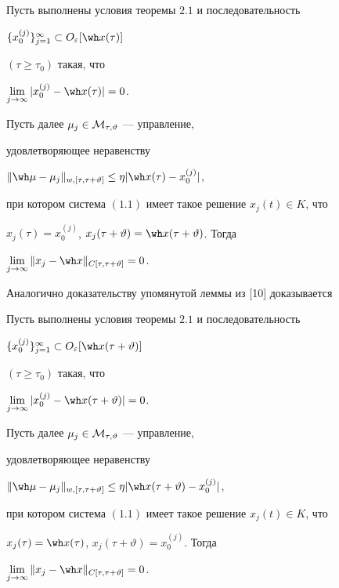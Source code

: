 \begin{lems}


Пусть выполнены условия теоремы $2.1$ и последовательность


$\{x_0^{(j)}\}_{j=1}^\infty\subset O_\varepsilon[\wh x(\tau)]$


$(\tau\ge\tau_0)$ такая, что


$\lim\limits_{j\to\infty}|x_0^{(j)}-\wh x(\tau)|=0$.


Пусть далее $\mu_j\in\cal M_{\tau,\vartheta}$ --- управление,


удовлетворяющее неравенству


$\|\wh\mu-\mu_j\|_{w,[\tau,\tau+\vartheta]}\le\eta|\wh


x(\tau)-x_0^{(j)}|$,


при котором система $(1.1)$ имеет такое решение $x_j(t)\in K$, что


$x_j(\tau)=x_0^{(j)}$, $x_{j}(\tau+\vartheta)=\wh


x(\tau+\vartheta)$. Тогда


$\lim\limits_{j\to\infty}\|x_j-\wh x\|_{C[\tau,\tau+\vartheta]}=0$.


\end{lems}





Аналогично доказательству упомянутой леммы из [10] доказывается








\begin{lems}


Пусть выполнены условия теоремы $2.1$ и последовательность


$\{x_0^{(j)}\}_{j=1}^\infty


\subset O_\varepsilon[\wh x(\tau+\vartheta)]$


$(\tau\ge\tau_0)$ такая, что


$\lim\limits_{j\to\infty}|x_0^{(j)}-\wh x(\tau+\vartheta)|=0$.


Пусть далее $\mu_j\in\cal M_{\tau,\vartheta}$ --- управление,


удовлетворяющее неравенству


$\|\wh\mu-\mu_j\|_{w,[\tau,\tau+\vartheta]}\le\eta|\wh


x(\tau+\vartheta)-x_0^{(j)}|$,


при котором система $(1.1)$ имеет такое решение $x_j(t)\in K$, что


$x_j(\tau)=\wh x(\tau)$, $x_j(\tau+\vartheta)=x_0^{(j)}$. Тогда


$\lim\limits_{j\to\infty}\|x_j-\wh x\|_{C[\tau,\tau+\vartheta]}=0$.


\end{lems}








